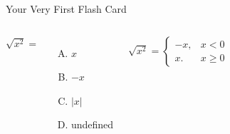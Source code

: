 \documentclass{beamer}
\begin{document}
\begin{frame}{Your Very First Flash Card} \vspace{10pt}
\begin{columns}[onlytextwidth]
$\sqrt{x^2}=$\\[10pt]
\begin{enumerate}[(A)]
\item $x$
\item $-x$
\item $|x|$
\item undefined
\end{enumerate}
 {
$\sqrt{x^2}=
\begin{cases}
    -x, & x < 0 \\
    x. & x \geq 0
\end{cases}$ \\[10pt]}
\end{columns}
\end{frame}
\end{document}
